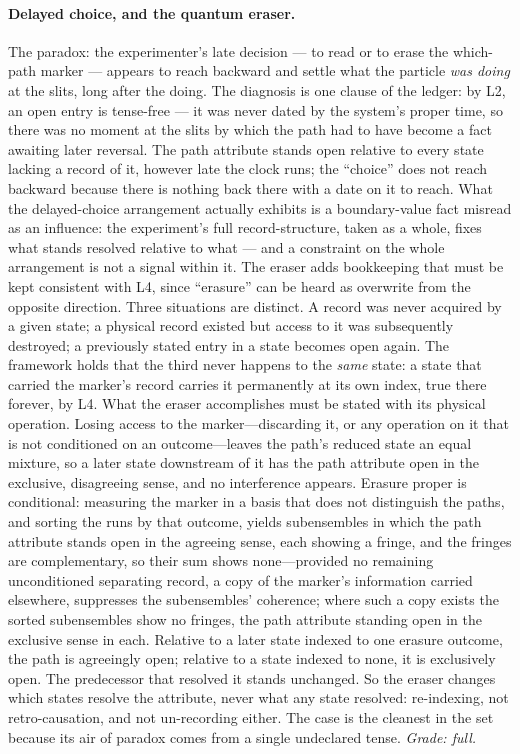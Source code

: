 \paragraph{Delayed choice, and the quantum eraser.} The paradox: the experimenter's late decision --- to read or to erase the which-path marker --- appears to reach backward and settle what the particle \emph{was doing} at the slits, long after the doing. The diagnosis is one clause of the ledger: by L2, an open entry is tense-free --- it was never dated by the system's proper time, so there was no moment at the slits by which the path had to have become a fact awaiting later reversal. The path attribute stands open relative to every state lacking a record of it, however late the clock runs; the ``choice'' does not reach backward because there is nothing back there with a date on it to reach. What the delayed-choice arrangement actually exhibits is a boundary-value fact misread as an influence: the experiment's full record-structure, taken as a whole, fixes what stands resolved relative to what --- and a constraint on the whole arrangement is not a signal within it. The eraser adds bookkeeping that must be kept consistent with L4, since ``erasure'' can be heard as overwrite from the opposite direction. Three situations are distinct. A record was never acquired by a given state; a physical record existed but access to it was subsequently destroyed; a previously stated entry in a state becomes open again. The framework holds that the third never happens to the \emph{same} state: a state that carried the marker's record carries it permanently at its own index, true there forever, by L4. What the eraser accomplishes must be stated with its physical operation. Losing access to the marker---discarding it, or any operation on it that is not conditioned on an outcome---leaves the path's reduced state an equal mixture, so a later state downstream of it has the path attribute open in the exclusive, disagreeing sense, and no interference appears. Erasure proper is conditional: measuring the marker in a basis that does not distinguish the paths, and sorting the runs by that outcome, yields subensembles in which the path attribute stands open in the agreeing sense, each showing a fringe, and the fringes are complementary, so their sum shows none---provided no remaining unconditioned separating record, a copy of the marker's information carried elsewhere, suppresses the subensembles' coherence; where such a copy exists the sorted subensembles show no fringes, the path attribute standing open in the exclusive sense in each. Relative to a later state indexed to one erasure outcome, the path is agreeingly open; relative to a state indexed to none, it is exclusively open. The predecessor that resolved it stands unchanged. So the eraser changes which states resolve the attribute, never what any state resolved: re-indexing, not retro-causation, and not un-recording either. The case is the cleanest in the set because its air of paradox comes from a single undeclared tense. \emph{Grade: full.}

